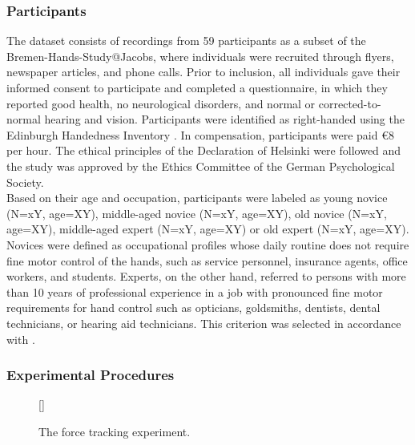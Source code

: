 \subsubsection{Participants}
The dataset consists of recordings from 59 participants as a subset of the Bremen-Hands-Study@Jacobs, where individuals were recruited through flyers, newspaper articles, and phone calls. Prior to inclusion, all individuals gave their informed consent to participate and completed a questionnaire, in which they reported good health, no neurological disorders, and normal or corrected-to-normal hearing and vision. Participants were identified as right-handed using the Edinburgh Handedness Inventory \cite{Oldfield1971}. In compensation, participants were paid \euro{8} per hour. The ethical principles of the Declaration of Helsinki were followed and the study was approved by the Ethics Committee of the German Psychological Society.\\
Based on their age and occupation, participants were labeled as young novice (N=xY, age=XY), middle-aged novice (N=xY, age=XY), old novice (N=xY, age=XY), middle-aged expert (N=xY, age=XY) or old expert (N=xY, age=XY). Novices were defined as occupational profiles whose daily routine does not require fine motor control of the hands, such as service personnel, insurance agents, office workers, and students. Experts, on the other hand, referred to persons with more than 10 years of professional experience in a job with pronounced fine motor requirements for hand control such as opticians, goldsmiths, dentists, dental technicians, or hearing aid technicians. This criterion was selected in accordance with \cite{Ericsson1991}. 

\subsubsection{Experimental Procedures}
\begin{figure}[h]
[\FBwidth]
{}
{\caption[The force tracking experiment.]{The force tracking experiment.}
\label{fig:ml_forms}}
\end{figure}

